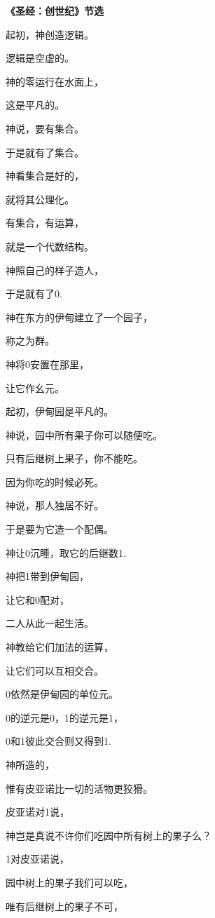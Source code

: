 \begin{centering}
\begin{Large}
\textbf{《圣经：创世纪》节选}
\end{Large}\vsp
\large

起初，神创造逻辑。

逻辑是空虚的。

神的零运行在水面上，

这是平凡的。

神说，要有集合。

于是就有了集合。

神看集合是好的， 

就将其公理化。

有集合，有运算，

就是一个代数结构。\vsp

神照自己的样子造人，

于是就有了0.

神在东方的伊甸建立了一个园子，

称之为群。

神将0安置在那里，

让它作幺元。

起初，伊甸园是平凡的。

神说，园中所有果子你可以随便吃。

只有后继树上果子，你不能吃。

因为你吃的时候必死。\vsp

神说，那人独居不好。

于是要为它造一个配偶。

神让0沉睡，取它的后继数1.

神把1带到伊甸园，

让它和0配对，

二人从此一起生活。

神教给它们加法的运算，

让它们可以互相交合。

0依然是伊甸园的单位元。

0的逆元是0，1的逆元是1，

0和1彼此交合则又得到1.\vsp

神所造的，

惟有皮亚诺比一切的活物更狡猾。

皮亚诺对1说，

神岂是真说不许你们吃园中所有树上的果子么？

1对皮亚诺说，

园中树上的果子我们可以吃，

唯有后继树上的果子不可，


\end{centering}
